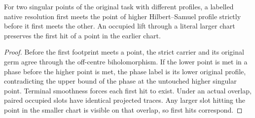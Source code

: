 \begin{theorem}
\label{hir:g8-first-footprint-order}
\leanok
For two singular points of the original task with different profiles,
a labelled native resolution first meets the point of higher
Hilbert--Samuel profile strictly before it first meets the other.
An occupied lift through a literal larger chart preserves the first
hit of a point in the earlier chart.
\end{theorem}
\begin{proof}
Before the first footprint meets a point, the strict carrier and its
original germ agree through the off-centre biholomorphism. If the
lower point is met in a phase before the higher point is met, the
phase label is its lower original profile, contradicting the upper
bound of the phase at the untouched higher singular point. Terminal
smoothness forces each first hit to exist. Under an actual overlap,
paired occupied slots have identical projected traces. Any larger
slot hitting the point in the smaller chart is visible on that
overlap, so first hits correspond.
\end{proof}

